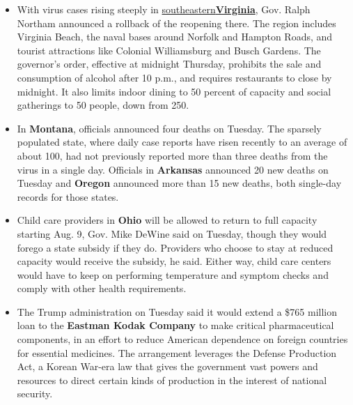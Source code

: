 \begin{itemize}
\item
  With virus cases rising steeply in
  \href{https://slack-redir.net/link?url=https\%3A\%2F\%2Fwww.virginia.org\%2FRegions\%2FHamptonRoads}{southeastern}\textbf{\href{https://slack-redir.net/link?url=https\%3A\%2F\%2Fwww.virginia.org\%2FRegions\%2FHamptonRoads}{Virginia}},
  Gov. Ralph Northam announced a rollback of the reopening there. The
  region includes Virginia Beach, the naval bases around Norfolk and
  Hampton Roads, and tourist attractions like Colonial Williamsburg and
  Busch Gardens. The governor's order, effective at midnight Thursday,
  prohibits the sale and consumption of alcohol after 10 p.m., and
  requires restaurants to close by midnight. It also limits indoor
  dining to 50 percent of capacity and social gatherings to 50 people,
  down from 250.
\item
  In \textbf{Montana}, officials announced four deaths on Tuesday. The
  sparsely populated state, where daily case reports have risen recently
  to an average of about 100, had not previously reported more than
  three deaths from the virus in a single day. Officials in
  \textbf{Arkansas} announced 20 new deaths on Tuesday and
  \textbf{Oregon} announced more than 15 new deaths, both single-day
  records for those states.
\item
  Child care providers in \textbf{Ohio} will be allowed to return to
  full capacity starting Aug. 9, Gov. Mike DeWine said on Tuesday,
  though they would forego a state subsidy if they do. Providers who
  choose to stay at reduced capacity would receive the subsidy, he said.
  Either way, child care centers would have to keep on performing
  temperature and symptom checks and comply with other health
  requirements.
\item
  The Trump administration on Tuesday said it would extend a \$765
  million loan to the \textbf{Eastman Kodak Company} to make critical
  pharmaceutical components, in an effort to reduce American dependence
  on foreign countries for essential medicines. The arrangement
  leverages the Defense Production Act, a Korean War-era law that gives
  the government vast powers and resources to direct certain kinds of
  production in the interest of national security.
\end{itemize}

